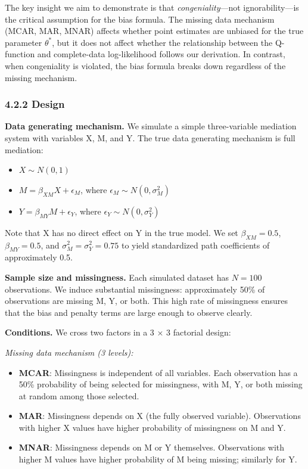 \documentclass[
]{article}
\providecommand{\tightlist}{%
  \setlength{\itemsep}{0pt}\setlength{\parskip}{0pt}}
\begin{document}
The key insight we aim to demonstrate is that \emph{congeniality}---not
ignorability---is the critical assumption for the bias formula. The
missing data mechanism (MCAR, MAR, MNAR) affects whether point estimates
are unbiased for the true parameter \(\theta^*\), but it does not affect
whether the relationship between the Q-function and complete-data
log-likelihood follows our derivation. In contrast, when congeniality is
violated, the bias formula breaks down regardless of the missing
mechanism.

\subsubsection{4.2.2 Design}\label{design}

\textbf{Data generating mechanism.} We simulate a simple three-variable
mediation system with variables X, M, and Y. The true data generating
mechanism is full mediation:

\begin{itemize}
\tightlist
\item
  \(X \sim N(0, 1)\)
\item
  \(M = \beta_{XM} X + \epsilon_M\), where
  \(\epsilon_M \sim N(0, \sigma^2_M)\)
\item
  \(Y = \beta_{MY} M + \epsilon_Y\), where
  \(\epsilon_Y \sim N(0, \sigma^2_Y)\)
\end{itemize}

Note that X has no direct effect on Y in the true model. We set
\(\beta_{XM} = 0.5\), \(\beta_{MY} = 0.5\), and
\(\sigma^2_M = \sigma^2_Y = 0.75\) to yield standardized path
coefficients of approximately 0.5.

\textbf{Sample size and missingness.} Each simulated dataset has
\(N = 100\) observations. We induce substantial missingness:
approximately 50\% of observations are missing M, Y, or both. This high
rate of missingness ensures that the bias and penalty terms are large
enough to observe clearly.

\textbf{Conditions.} We cross two factors in a 3 × 3 factorial design:

\emph{Missing data mechanism (3 levels):}

\begin{itemize}
\tightlist
\item
  \textbf{MCAR}: Missingness is independent of all variables. Each
  observation has a 50\% probability of being selected for missingness,
  with M, Y, or both missing at random among those selected.
\item
  \textbf{MAR}: Missingness depends on X (the fully observed variable).
  Observations with higher X values have higher probability of
  missingness on M and Y.
\item
  \textbf{MNAR}: Missingness depends on M or Y themselves. Observations
  with higher M values have higher probability of M being missing;
  similarly for Y.
\end{itemize}
\end{document}
